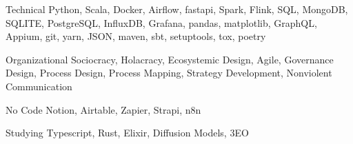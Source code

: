 \documentclass{tccv}
\begin{document}
\begin{factlist}

\item{Technical}
     {Python, Scala, Docker, Airflow, fastapi, Spark, Flink, SQL, MongoDB, SQLITE, PostgreSQL, InfluxDB, Grafana, pandas, matplotlib, GraphQL, Appium, git, yarn, JSON, maven, sbt, setuptools, tox, poetry}

\item{Organizational}
{Sociocracy, Holacracy, Ecosystemic Design, Agile, Governance Design, Process Design, Process Mapping, Strategy Development, Nonviolent Communication}


\item{No Code}
     {Notion, Airtable, Zapier, Strapi, n8n}

\item{Studying}
    {Typescript, Rust, Elixir, Diffusion Models, 3EO}

\end{factlist}
\end{document}

